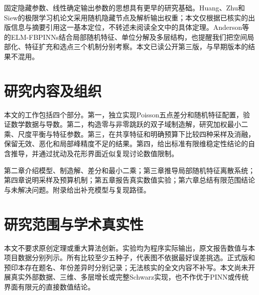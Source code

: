 固定隐藏参数、线性确定输出参数的思想具有更早的研究基础。Huang、Zhu和Siew的极限学习机论文采用随机隐藏节点及解析输出权重\cite{elm2006}；本文仅根据已核实的出版信息与摘要引用这一基本定位，不转述未阅读全文中的具体定理。Anderson等的ELM-FBPINNs结合局部随机特征、单位分解及多层结构\cite{elmfbp}，也提醒我们把空间局部化、特征扩充和选点三个机制分别考察。本文已读公开第三版，与早期版本的结果不混用。

\section{研究内容及组织}
本文的工作包括四个部分。第一，独立实现Poisson五点差分和随机特征配置，验证数学数据与导数。第二，构造零与非零跳跃的双子域制造解，研究加权最小二乘、尺度平衡与特征参数。第三，在共享特征和明确预算下比较四种采样及消融，保留无效、恶化和局部峰精度不足的结果。第四，给出标准有限维稳定性结论的自含推导，并通过扰动及花形界面近似复现讨论数值限制。

第二章介绍模型、制造解、差分和最小二乘；第三章推导局部随机特征离散系统；第四章说明采样及预算机制；第五章报告真实数值实验；第六章总结有限范围结论与未解决问题。附录给出补充模型与复现路径。

\section{研究范围与学术真实性}
本文不要求原创定理或重大算法创新。实验均为程序实际输出，原文报告数值与本项目数据分别列示。所有比较至少五种子，代表图不依据最好误差挑选。正式版和预印本存在题名、年份差异时分别记录；无法核实的全文内容不补写。本文尚未开展真实外部数据、三维、多层增长或完整Schwarz实现，也不作优于PINN或传统界面有限元的直接数值结论。


